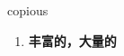
\begin{frame}
{\huge copious}
\begin{center}
\begin{enumerate}\Large
  \item \textbf{丰富的，大量的}
\end{enumerate}
\end{center}
\end{frame}
